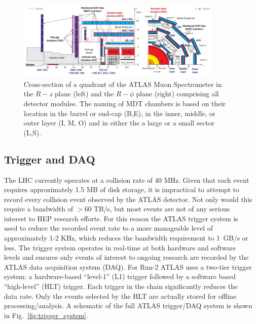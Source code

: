 \begin{figure}
	\centering
	\includegraphics[width=0.9\textwidth]{muon_spectrometer_quadrant}
	\caption{
	 Cross-section of a quadrant of the ATLAS Muon Spectrometer \cite{kuger2017signal} in the $R-z$ plane (left) and the $R-\phi$ plane (right) comprising all detector modules. The naming of MDT chambers is based on their location in the barrel or end-cap (B,E), in the inner, middle, or outer layer (I, M, O) and in either the a large or a small sector (L,S).
	}
\end{figure}

% 
\subsection{Trigger and DAQ}
The LHC currently operates at a collision rate of 40 MHz.
Given that each event requires approximately 1.5 MB of disk storage, it is impractical to attempt to record every collision event observed by the ATLAS detector.
Not only would this require a bandwidth of $> 60$ TB/s, but most events are not of any serious interest to HEP research efforts.
For this reason the ATLAS trigger system \cite{Ruiz-Martinez:2133909} is used to reduce the recorded event rate to a more manageable level of approximately 1-2 KHz, which reduces the bandwidth requirement to 1~GB/s or less.
The trigger system operates in real-time at both hardware and software levels and ensures only events of interest to ongoing research are recorded by the ATLAS data acquisition system (DAQ).
For Run-2 ATLAS uses a two-tier trigger system: a hardware-based ``level-1'' (L1) trigger followed by a software based ``high-level'' (HLT) trigger.
Each trigger in the chain significantly reduces the data rate.
Only the events selected by the HLT are actually stored for offline processing/analysis.
A schematic of the full ATLAS trigger/DAQ system is shown in Fig.~\ref{fig:trigger_system}.

